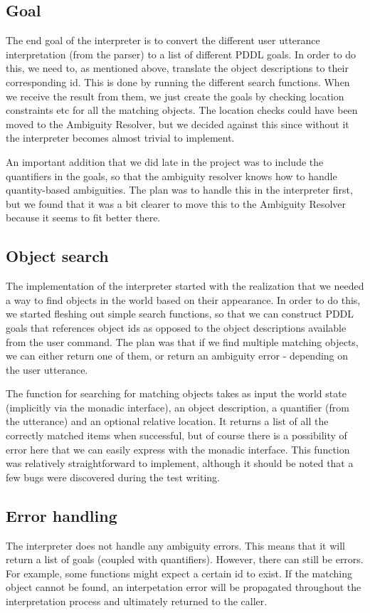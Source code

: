 \subsection*{Goal}
The end goal of the interpreter is to convert the different user utterance interpretation (from the parser) to a list of different PDDL goals.
In order to do this, we need to, as mentioned above, translate the object descriptions to their corresponding id.
This is done by running the different search functions.
When we receive the result from them, we just create the goals by checking location constraints etc for all the matching objects.
The location checks could have been moved to the Ambiguity Resolver, but we decided against this since without it the interpreter becomes almost trivial to implement.

An important addition that we did late in the project was to include the quantifiers in the goals, so that the ambiguity resolver knows how to handle quantity-based ambiguities.
The plan was to handle this in the interpreter first, but we found that it was a bit clearer to move this to the Ambiguity Resolver because it seems to fit better there.

\subsection*{Object search}
The implementation of the interpreter started with the realization that we needed a way to find objects in the world based on their appearance.
In order to do this, we started fleshing out simple search functions, so that we can construct PDDL goals that references object ids as opposed to the object descriptions available from the user command.
The plan was that if we find multiple matching objects, we can either return one of them, or return an ambiguity error - depending on the user utterance.

The function for searching for matching objects takes as input the world state (implicitly via the monadic interface), an object description, a quantifier (from the utterance) and an optional relative location.
It returns a list of all the correctly matched items when successful, but of course there is a possibility of error here that we can easily express with the monadic interface.
This function was relatively straightforward to implement, although it should be noted that a few bugs were discovered during the test writing.

\subsection*{Error handling}
The interpreter does not handle any ambiguity errors.
This means that it will return a list of goals (coupled with quantifiers).
However, there can still be errors. For example, some functions might expect a certain id to exist.
If the matching object cannot be found, an interpetation error will be propagated throughout the interpretation process and ultimately returned to the caller.
